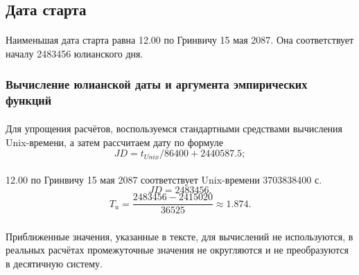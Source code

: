 
\subsection{Дата старта}
\paragraph{}Наименьшая дата старта равна 12.00 по Гринвичу 15 мая 2087. Она соответствует началу 2483456 юлианского дня.

\subsubsection{Вычисление юлианской даты и аргумента эмпирических функций}
\paragraph{} Для упрощения расчётов, воспользуемся стандартными средствами вычисления Unix-времени, а затем рассчитаем дату по формуле
$$JD = t_{Unix}/86400 + 2440587.5;$$
\paragraph{} 12.00 по Гринвичу 15 мая 2087 соответствует Unix-времени 3703838400 с.
$$JD = 2483456.$$
$$T_u = \frac{2483456 - 2415020}{36525} \approx 1.874.$$
\subparagraph{} Приближенные значения, указанные в тексте, для вычислений не используются, в реальных расчётах промежуточные значения не округляются и не преобразуются в десятичную систему.